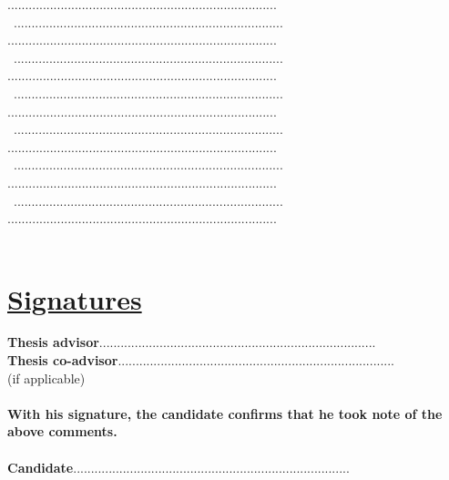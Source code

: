 \documentclass[11pt,titlepage]{article}
\begin{document}
............................................................................\\\
............................................................................
............................................................................\\\
............................................................................
............................................................................\\\
............................................................................
............................................................................\\\
............................................................................
............................................................................\\\
............................................................................
............................................................................\\\
............................................................................
............................................................................\\\

\section*{\underline{Signatures}\\}
\noindent \textbf{Thesis advisor}\hspace{6.25cm}..............................................................................\vspace{0.5cm}\\

\noindent \textbf{Thesis co-advisor}\hspace{5.7cm}..............................................................................\\
\noindent  (if applicable)\\\\

\noindent \textbf{With his signature, the candidate confirms that he took note of the above comments.}\\\\
\textbf{Candidate}\hspace{7cm}..............................................................................\vspace{0.5cm}\\
\end{document}
